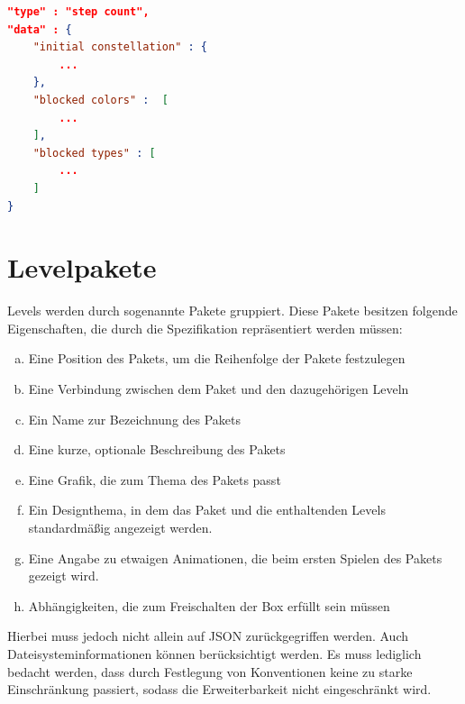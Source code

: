 \begin{lstlisting}[language=json,caption={Grober Aufbau des data Attributs eines "'Schrittzahl"' Levels}]
"type" : "step count",
"data" : {
	"initial constellation" : {
		...
	},
	"blocked colors" :  [
		...
	],
	"blocked types" : [
		...
	]
}
\end{lstlisting}

\section{Levelpakete}
Levels werden durch sogenannte Pakete gruppiert.
Diese Pakete besitzen folgende Eigenschaften, die durch die Spezifikation repräsentiert werden müssen:
\begin{enumerate}[a)]
	\item Eine Position des Pakets, um die Reihenfolge der Pakete festzulegen
	\item Eine Verbindung zwischen dem Paket und den dazugehörigen Leveln
	\item Ein Name zur Bezeichnung des Pakets
	\item Eine kurze, optionale Beschreibung des Pakets
	\item Eine Grafik, die zum Thema des Pakets passt
	\item Ein Designthema, in dem das Paket und die enthaltenden Levels standardmäßig angezeigt werden.
	\item Eine Angabe zu etwaigen Animationen, die beim ersten Spielen des Pakets gezeigt wird.
	\item Abhängigkeiten, die zum Freischalten der Box erfüllt sein müssen
\end{enumerate}
Hierbei muss jedoch nicht allein auf JSON zurückgegriffen werden.
Auch Dateisysteminformationen können berücksichtigt werden.
Es muss lediglich bedacht werden, dass durch Festlegung von Konventionen keine zu starke Einschränkung passiert, sodass die Erweiterbarkeit nicht eingeschränkt wird.

